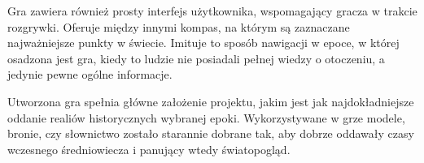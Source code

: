 Gra zawiera również prosty interfejs użytkownika, wspomagający gracza w trakcie rozgrywki. Oferuje między innymi kompas,
na którym są zaznaczane najważniejsze punkty w świecie. Imituje to sposób nawigacji w epoce, w której osadzona jest gra,
kiedy to ludzie nie posiadali pełnej wiedzy o otoczeniu, a jedynie pewne ogólne informacje.

Utworzona gra spełnia główne założenie projektu, jakim jest jak najdokładniejsze oddanie realiów historycznych wybranej
epoki. Wykorzystywane w grze modele, bronie, czy słownictwo zostało starannie dobrane tak, aby dobrze oddawały
czasy wczesnego średniowiecza i panujący wtedy światopogląd.



